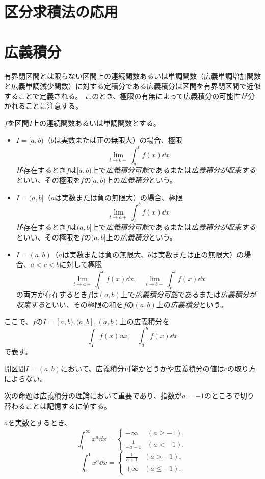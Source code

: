 \section{区分求積法の応用}

\section{広義積分}

有界閉区間とは限らない区間上の連続関数あるいは単調関数（広義単調増加関数と広義単調減少関数）に対する定積分である広義積分は区間を有界閉区間で近似することで定義される。
このとき、極限の有無によって広義積分の可能性が分かれることに注意する。

\begin{definition}[広義積分]
$f$を区間$I$上の連続関数あるいは単調関数とする。
\begin{itemize}
\item
$I = [a, b)$（$b$は実数または正の無限大）の場合、極限
$$
\lim_{t \to b-}\int_a^t f(x)\dd{x}
$$
が存在するとき$f$は$[a, b)$上で\emph{広義積分可能}であるまたは\emph{広義積分が収束する}といい、その極限を$f$の$[a, b)$上の\emph{広義積分}という。
\item
$I = (a, b]$（$a$は実数または負の無限大）の場合、極限
$$
\lim_{t \to a+}\int_t^b f(x)\dd{x}
$$
が存在するとき$f$は$(a, b]$上で\emph{広義積分可能}であるまたは\emph{広義積分が収束する}といい、その極限を$f$の$(a, b]$上の\emph{広義積分}という。
\item
$I = (a, b)$（$a$は実数または負の無限大、$b$は実数または正の無限大）の場合、$a < c < b$に対して極限
$$
\lim_{t \to a+}\int_t^c f(x)\dd{x}, \quad \lim_{t \to b-}\int_c^t f(x)\dd{x} 
$$
の両方が存在するとき$f$は$(a, b)$上で\emph{広義積分可能}であるまたは\emph{広義積分が収束する}といい、その極限の和を$f$の$(a, b)$上の\emph{広義積分}という。
\end{itemize}
ここで、$f$の$I = [a, b), (a, b], (a, b)$上の広義積分を
$$
\int_I f(x)\dd{x},
\quad \int_a^b f(x)\dd{x}
$$
で表す。
\end{definition}

\begin{remark}
開区間$I = (a, b)$において、広義積分可能かどうかや広義積分の値は$c$の取り方によらない。
\end{remark}

次の命題は広義積分の理論において重要であり、指数が$a = -1$のところで切り替わることは記憶するに値する。

\begin{proposition}
$a$を実数とするとき、
$$
\int_1^\infty x^a\dd{x} =
\begin{cases}
+\infty & (a \ge -1), \\
\frac{1}{-a-1} & (a < -1).
\end{cases}
$$
$$
\int_0^1 x^a\dd{x} =
\begin{cases}
\frac{1}{a+1} & (a > -1), \\
+\infty & (a \le -1).
\end{cases}
$$
\end{proposition}

